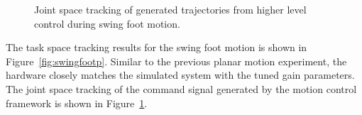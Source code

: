 \begin{figure}[!h]
	\begin{center}
	\end{center}
  	\caption{Joint space tracking of generated trajectories from higher level control during swing foot motion.}
	\label{fig:swingfootq}
\end{figure} 

The task space tracking results for the swing foot motion is shown in Figure~\ref{fig:swingfootp}. Similar to the previous planar motion experiment, the hardware closely matches the simulated system with the tuned gain parameters. The joint space tracking of the command signal generated by the motion control framework is shown in Figure~\ref{fig:swingfootq}.



